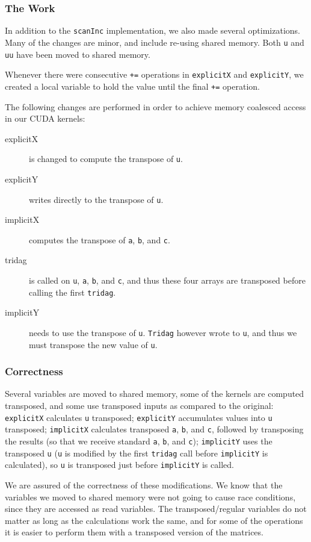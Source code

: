 \documentclass[12pt, oneside]{article}
\begin{document}
\subsubsection{The Work}
In addition to the \texttt{scanInc} implementation, we also made several optimizations. Many of the changes are minor, and include re-using shared memory. Both \texttt{u} and \texttt{uu} have been moved to shared memory.

Whenever there were consecutive \texttt{+=} operations in \texttt{explicitX} and \texttt{explicitY}, we created a local variable to hold the value until the final \texttt{+=} operation.

The following changes are performed in order to achieve memory coalesced access in our CUDA kernels:
\begin{description}
\item[explicitX] is changed to compute the transpose of \texttt{u}.
\item[explicitY] writes directly to the transpose of \texttt{u}.
\item[implicitX] computes the transpose of \texttt{a}, \texttt{b}, and \texttt{c}.
\item[tridag] is called on \texttt{u}, \texttt{a}, \texttt{b}, and \texttt{c}, and thus these four arrays are transposed before calling the first \texttt{tridag}.
\item[implicitY] needs to use the transpose of \texttt{u}. \texttt{Tridag} however wrote to \texttt{u}, and thus we must transpose the new value of \texttt{u}.
\end{description}

\subsubsection{Correctness}
Several variables are moved to shared memory, some of the kernels are computed transposed, and some use transposed inputs as compared to the original: \texttt{explicitX} calculates \texttt{u} transposed; \texttt{explicitY} accumulates values into \texttt{u} transposed; \texttt{implicitX} calculates transposed \texttt{a}, \texttt{b}, and \texttt{c}, followed by transposing the results (so that we receive standard \texttt{a}, \texttt{b}, and \texttt{c}); \texttt{implicitY} uses the transposed \texttt{u} (\texttt{u} is modified by the first \texttt{tridag} call before \texttt{implicitY} is calculated), so \texttt{u} is transposed just before \texttt{implicitY} is called.

We are assured of the correctness of these modifications. We know that the variables we moved to shared memory were not going to cause race conditions, since they are accessed as read variables. The transposed/regular variables do not matter as long as the calculations work the same, and for some of the operations it is easier to perform them with a transposed version of the matrices.
\end{document}
